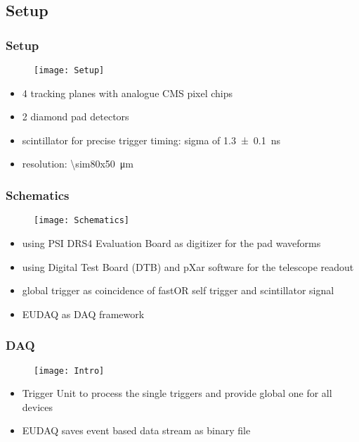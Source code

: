 \subsection{Setup}
\begin{frame}
	\frametitle{Setup}
	\begin{figure}
		\centering
		\texttt{[image: Setup]}
	\end{figure}
	\begin{itemize}
		\setlength{\itemsep}{\fill}
		\item 4 tracking planes with analogue CMS pixel chips
		\item 2 diamond pad detectors
		\item scintillator for precise trigger timing: sigma of \SI{1.3\pm.1}{ns}
		\item resolution: \SI{\sim80x50}{\micro\meter}
	\end{itemize}
\end{frame}
\begin{frame}
	\frametitle{Schematics}
	\begin{figure}
		\centering
		\texttt{[image: Schematics]}
	\end{figure}
	\begin{itemize}
		\setlength{\itemsep}{\fill}
		\item using PSI DRS4 Evaluation Board as digitizer for the pad waveforms
		\item using Digital Test Board (DTB) and pXar software for the telescope readout
		\item global trigger as coincidence of fastOR self trigger and scintillator signal
		\item EUDAQ as DAQ framework
	\end{itemize}
\end{frame}
\begin{frame}
	\frametitle{DAQ}
	\begin{figure}
		\centering
		\texttt{[image: Intro]}
	\end{figure}
	\begin{itemize}
		\item Trigger Unit to process the single triggers and provide global one for all devices
		\item EUDAQ saves event based data stream as binary file
	\end{itemize}
\end{frame}